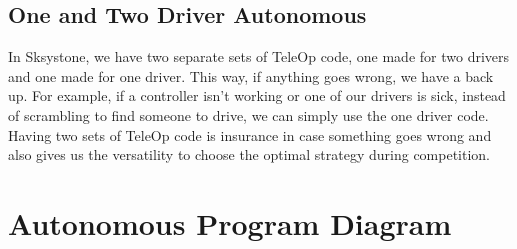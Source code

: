 \documentclass{article}[12pt]
\begin{document}
\subsection{One and Two Driver Autonomous}

In Sksystone, we have two separate sets of TeleOp code, one made for two drivers and one made for one driver. This way, if anything goes wrong, we have a back up. For example, if a controller isn’t working or one of our drivers is sick, instead of scrambling to find someone to drive, we can simply use the one driver code. Having two sets of TeleOp code is insurance in case something goes wrong and also gives us the versatility to choose the optimal strategy during competition.
\clearpage

\section{Autonomous Program Diagram}
\end{document}
